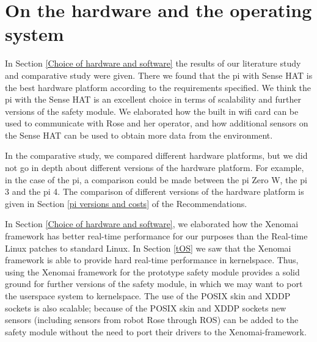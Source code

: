 \documentclass[12pt]{scrreprt}
\begin{document}
\section{On the hardware and the operating system}
In Section \ref{Choice of hardware and software} the results of our literature study and comparative study were given. There we found that the \gls{pi} with Sense HAT is the best hardware platform according to the requirements specified. We think the \gls{pi} with the Sense HAT is an excellent choice in terms of scalability and further versions of the safety module. We elaborated how the built in \gls{wifi} card can be used to communicate with Rose and her operator, and how additional sensors on the Sense HAT can be used to obtain more data from the environment.
\par
In the comparative study, we compared different hardware platforms, but we did not go in depth about different versions of the hardware platform. For example, in the case of the \gls{pi}, a comparison could be made between the \gls{pi} Zero W, the \gls{pi} 3 and the \gls{pi} 4. The comparison of different versions of the hardware platform is given in Section \ref{pi versions and costs}  of the Recommendations.
\par
In Section \ref{Choice of hardware and software}, we elaborated how the Xenomai framework has better real-time performance for our purposes than the Real-time Linux patches to standard Linux. In Section \ref{tOS} we saw that the Xenomai framework is able to provide hard real-time performance in kernelspace. Thus, using the Xenomai framework for the prototype safety module provides a solid ground for further versions of the safety module, in which we may want to port the userspace system to kernelspace. The use of the POSIX skin and XDDP sockets is also scalable; because of the POSIX skin and XDDP sockets new sensors (including sensors from robot Rose through ROS) can be added to the safety module without the need to port their drivers to the Xenomai-framework.
\end{document}
